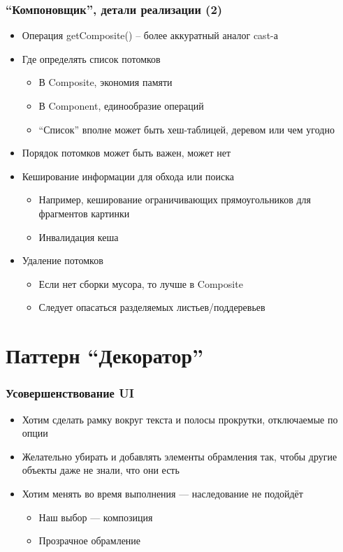 \documentclass[xetex,mathserif,serif]{beamer}
\begin{document}
	\begin{frame}
		\frametitle{``Компоновщик'', детали реализации (2)}
		\begin{itemize}
			\item Операция getComposite() – более аккуратный аналог cast-а
			\item Где определять список потомков
			\begin{itemize}
				\item В Composite, экономия памяти
				\item В Component, единообразие операций
				\item ``Список'' вполне может быть хеш-таблицей, деревом или чем угодно
			\end{itemize}
			\item Порядок потомков может быть важен, может нет
			\item Кеширование информации для обхода или поиска
			\begin{itemize}
				\item Например, кеширование ограничивающих прямоугольников для фрагментов картинки
				\item Инвалидация кеша
			\end{itemize}
			\item Удаление потомков
			\begin{itemize}
				\item Если нет сборки мусора, то лучше в Composite
				\item Следует опасаться разделяемых листьев/поддеревьев
			\end{itemize}
		\end{itemize}
	\end{frame}

	\section{Паттерн ``Декоратор''}

	\begin{frame}
		\frametitle{Усовершенствование UI}
		\begin{itemize}
			\item Хотим сделать рамку вокруг текста и полосы прокрутки, отключаемые по опции
			\item Желательно убирать и добавлять элементы обрамления так, чтобы другие объекты даже не знали, что они есть
			\item Хотим менять во время выполнения --- наследование не подойдёт
			\begin{itemize}
				\item Наш выбор ­--- композиция
				\item Прозрачное обрамление
			\end{itemize}
		\end{itemize}
	\end{frame}
\end{document}
